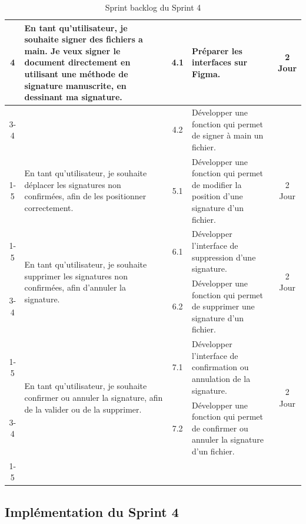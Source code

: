 \begin{adjustwidth}{-1cm}{}
\begin{longtable}{|c|p{6cm}|c|p{6cm}|c|}
      \multirow{3}{*}{4} & En tant qu'utilisateur, je souhaite signer des fichiers a main. Je veux signer le document directement en utilisant une méthode de signature manuscrite, en dessinant ma signature. & 4.1 & Préparer les interfaces sur Figma. & \multirow{3}{*}{2 Jour} \\
      \cline{3-4}
      & & 4.2 & Développer une fonction qui permet de signer à main un fichier. & \\
      \cline{1-5}

      \multirow{1}{*}{5} & En tant qu'utilisateur, je souhaite déplacer les signatures non confirmées, afin de les positionner correctement.& 5.1 & Développer une fonction qui permet de modifier la position d'une signature d'un fichier. & \multirow{1}{*}{2 Jour} \\
      \cline{1-5}

      \multirow{2}{*}{6} & \multirow{2}{6cm}{En tant qu'utilisateur, je souhaite supprimer les signatures non confirmées, afin d'annuler la signature.}& 6.1 & Développer l'interface de suppression d'une signature. & \multirow{2}{*}{2 Jour} \\
      \cline{3-4}
      & & 6.2 & Développer une fonction qui permet de supprimer une signature d'un fichier. & \\
      \cline{1-5}

      \multirow{2}{*}{7} &\multirow{2}{6cm}{ En tant qu'utilisateur, je souhaite confirmer ou annuler la signature, afin de la valider ou de la supprimer.}& 7.1 & Développer l'interface de confirmation ou annulation de la signature. & \multirow{2}{*}{2 Jour} \\
      \cline{3-4}
      & & 7.2 & Développer une fonction qui permet de confirmer ou annuler la signature d'un fichier. & \\
      \cline{1-5}
      
  \hline
  \caption{Sprint backlog du Sprint 4}
  \label{tab:sprint-backlog-4}
\end{longtable}
\end{adjustwidth}

\subsection{Implémentation du Sprint 4}
